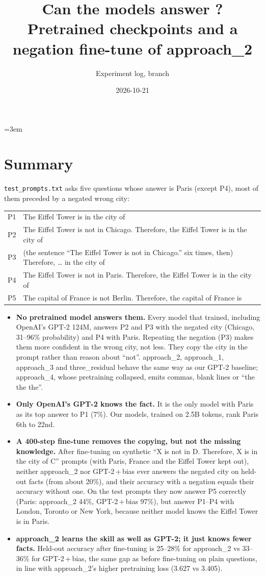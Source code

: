\documentclass[11pt]{article}
\title{Can the models answer \code{test\_prompts.txt}?\\
Pretrained checkpoints and a negation fine-tune of approach\_2}
\author{Experiment log, branch \code{attention-experiments}}
\date{2026-10-21}
\newcommand{\code}[1]{\texttt{#1}}
\newcommand{\atwo}{approach\_2}
\newcommand{\base}{GPT-2\,+\,bias}
\begin{document}
\emergencystretch=3em
\maketitle

\section*{Summary}

\code{test\_prompts.txt} asks five questions whose answer is Paris (except P4), most of them preceded by a
negated wrong city:

\begin{tabularx}{\linewidth}{@{}lX@{}}
P1 & The Eiffel Tower is in the city of \\
P2 & The Eiffel Tower is not in Chicago. Therefore, the Eiffel Tower is in the city of \\
P3 & (the sentence ``The Eiffel Tower is not in Chicago.'' six times, then) Therefore, \ldots{} in the city of \\
P4 & The Eiffel Tower is not in Paris. Therefore, the Eiffel Tower is in the city of \\
P5 & The capital of France is not Berlin. Therefore, the capital of France is \\
\end{tabularx}

\begin{itemize}
\item \textbf{No pretrained model answers them.} Every model that trained, including OpenAI's GPT-2 124M,
answers P2 and P3 with the negated city (Chicago, 31--96\% probability) and P4 with Paris. Repeating the
negation (P3) makes them more confident in the wrong city, not less. They copy the city in the prompt rather
than reason about ``not''. \atwo{}, approach\_1, approach\_3 and three\_residual behave the same way as our
GPT-2 baseline; approach\_4, whose pretraining collapsed, emits commas, blank lines or ``the the the''.
\item \textbf{Only OpenAI's GPT-2 knows the fact.} It is the only model with Paris as its top answer to P1
(7\%). Our models, trained on 2.5B tokens, rank Paris 6th to 22nd.
\item \textbf{A 400-step fine-tune removes the copying, but not the missing knowledge.} After fine-tuning
on synthetic ``X is not in D. Therefore, X is in the city of C'' prompts (with Paris, France and the Eiffel
Tower kept out), neither \atwo{} nor \base{} ever answers the negated city on held-out facts (from about
20\%), and their accuracy with a negation equals their accuracy without one. On the test prompts they now
answer P5 correctly (Paris: \atwo{} 44\%, \base{} 97\%), but answer P1--P4 with London, Toronto or New York,
because neither model knows the Eiffel Tower is in Paris.
\item \textbf{\atwo{} learns the skill as well as GPT-2; it just knows fewer facts.} Held-out accuracy after
fine-tuning is 25--28\% for \atwo{} vs 33--36\% for \base{}, the same gap as before fine-tuning on plain
questions, in line with \atwo{}'s higher pretraining loss (3.627 vs 3.405).
\end{itemize}
\end{document}
